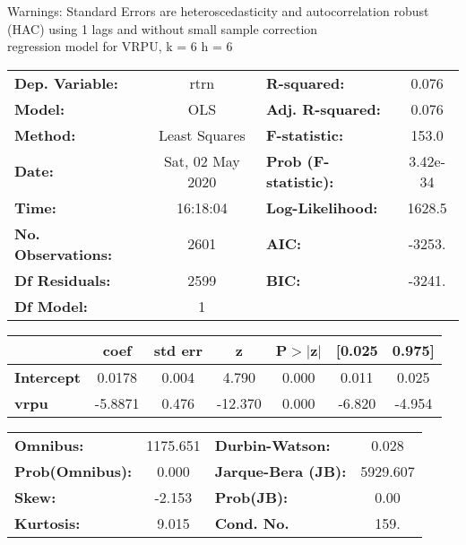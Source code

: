 Warnings: \newline
 [1] Standard Errors are heteroscedasticity and autocorrelation robust (HAC) using 1 lags and without small sample correction\\ 

regression model for VRPU, k = 6 h = 6\begin{center}
\begin{tabular}{lclc}
\toprule
\textbf{Dep. Variable:}    &       rtrn       & \textbf{  R-squared:         } &     0.076   \\
\textbf{Model:}            &       OLS        & \textbf{  Adj. R-squared:    } &     0.076   \\
\textbf{Method:}           &  Least Squares   & \textbf{  F-statistic:       } &     153.0   \\
\textbf{Date:}             & Sat, 02 May 2020 & \textbf{  Prob (F-statistic):} &  3.42e-34   \\
\textbf{Time:}             &     16:18:04     & \textbf{  Log-Likelihood:    } &    1628.5   \\
\textbf{No. Observations:} &        2601      & \textbf{  AIC:               } &    -3253.   \\
\textbf{Df Residuals:}     &        2599      & \textbf{  BIC:               } &    -3241.   \\
\textbf{Df Model:}         &           1      & \textbf{                     } &             \\
\bottomrule
\end{tabular}
\begin{tabular}{lcccccc}
                   & \textbf{coef} & \textbf{std err} & \textbf{z} & \textbf{P$> |$z$|$} & \textbf{[0.025} & \textbf{0.975]}  \\
\midrule
\textbf{Intercept} &       0.0178  &        0.004     &     4.790  &         0.000        &        0.011    &        0.025     \\
\textbf{vrpu}      &      -5.8871  &        0.476     &   -12.370  &         0.000        &       -6.820    &       -4.954     \\
\bottomrule
\end{tabular}
\begin{tabular}{lclc}
\textbf{Omnibus:}       & 1175.651 & \textbf{  Durbin-Watson:     } &    0.028  \\
\textbf{Prob(Omnibus):} &   0.000  & \textbf{  Jarque-Bera (JB):  } & 5929.607  \\
\textbf{Skew:}          &  -2.153  & \textbf{  Prob(JB):          } &     0.00  \\
\textbf{Kurtosis:}      &   9.015  & \textbf{  Cond. No.          } &     159.  \\
\bottomrule
\end{tabular}
\end{center}

